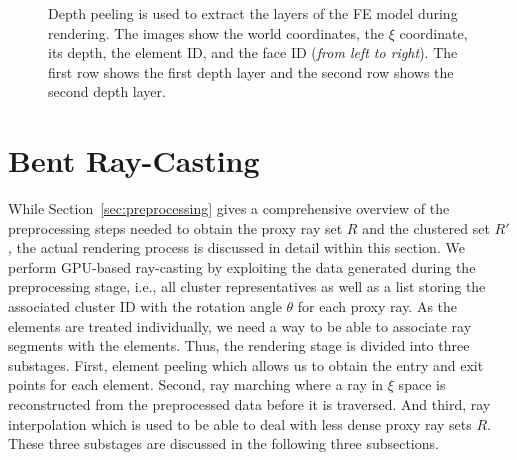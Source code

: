 \documentclass[journal]{vgtc}                %
\begin{document}
\begin{figure}[t]
    \caption{Depth peeling is used to extract the layers of the FE model during rendering. The images show the world coordinates, the $\xi$ coordinate, its depth, the element ID, and the face ID ({\it from left to right}). The first row shows the first depth layer and the second row shows the second depth layer.}
    \label{fig:depthpeeling}
\end{figure}
%
%
%
\section{Bent Ray-Casting}\label{sec:rendering}
While Section~\ref{sec:preprocessing} gives a comprehensive overview of the preprocessing steps needed to obtain the proxy ray set $R$ and the clustered set $R'$, the actual rendering process is discussed in detail within this section. We perform GPU-based ray-casting by exploiting the data generated during the preprocessing stage, i.e., all cluster representatives as well as a list storing the associated cluster ID with the rotation angle $\theta$ for each proxy ray. As the elements are treated individually, we need a way to be able to associate ray segments with the elements. Thus, the rendering stage is divided into three substages. First, element peeling which allows us to obtain the entry and exit points for each element. Second, ray marching where a ray in $\xi$ space is reconstructed from the preprocessed data before it is traversed. And third, ray interpolation which is used to be able to deal with less dense proxy ray sets $R$. These three substages are discussed in the following three subsections.
%
%
%
\end{document}
